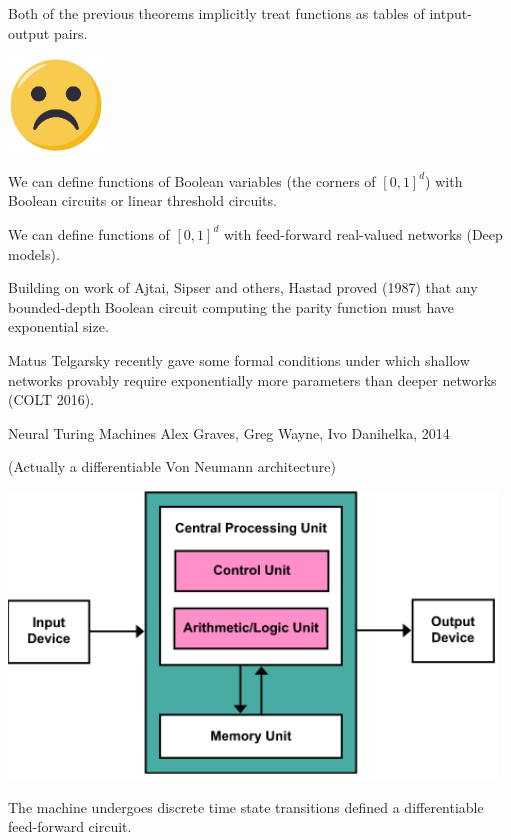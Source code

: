 {Both of the previous theorems implicitly treat functions as tables of intput-output pairs.

\vfill
\centerline{\includegraphics[height = 1in]{../images/Frown}}


We can define functions of Boolean variables (the corners of $[0,1]^d$) with Boolean circuits or linear threshold circuits.

\vfill
We can define functions of $[0,1]^d$ with feed-forward real-valued networks (Deep models).


Building on work of Ajtai, Sipser and others, Hastad proved (1987) that any bounded-depth Boolean circuit computing the parity function must have exponential size. 

\vfill
Matus Telgarsky recently gave some formal conditions under which shallow networks provably require exponentially more parameters than deeper networks (COLT 2016).


Neural Turing Machines
Alex Graves, Greg Wayne, Ivo Danihelka, 2014

\vfill
(Actually a differentiable Von Neumann architecture)

\vfill
\centerline{\includegraphics[height = 3in]{../images/VNA}}

\vfill
The machine undergoes discrete time state transitions defined a differentiable feed-forward circuit.

}
